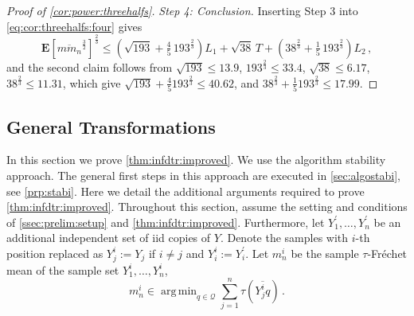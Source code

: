 \documentclass{article}
\newcommand*{\mc}[1]{\mathcal{#1}}
\newcommand{\lab}{\left[} %
\newcommand{\rab}{\right]} %
\newcommand{\ab}[1]{\lab #1 \rab} %
\newcommand{\abOf}[1]{\!\ab{#1}} %
\newcommand{\lb}{\left(} %
\newcommand{\rb}{\right)} %
\newcommand{\br}[1]{\lb #1 \rb} %
\newcommand{\E}{\mathbf{E}} %
\newcommand{\EOf}[1]{\E\abOf{#1}}
\newcommand{\pr}{^\prime}
\newcommand{\eqcm}{\,,} %
\newcommand{\eqfs}{\,.}
\DeclareMathOperator*{\argmin}{arg\,min}
\newcommand{\ol}[2]{\overline{#1#2}}
\newcommand{\tran}{\tau}
\begin{document}
\begin{proof}[Proof of \cref{cor:power:threehalfs}]
    \emph{Step 4: Conclusion.}
    Inserting Step 3 into \eqref{eq:cor:threehalfs:four} gives
    \begin{equation}
        \EOf{\ol{m}{m_n}^{\frac32}}^{\frac23}
        \leq
        \br{\sqrt{193} + \tfrac45\, 193^{\frac23}} L_1
        +
        \sqrt{38}\, T
        +
        \br{38^{\frac23} + \tfrac15\, 193^{\frac23}} L_2
        \eqcm
    \end{equation}
    and the second claim follows from
    $\sqrt{193} \leq 13.9$, $193^{\frac23}\leq 33.4$, $\sqrt{38}\leq 6.17$, $38^{\frac23}\leq 11.31$, which give
    $\sqrt{193} + \frac45 193^{\frac23} \leq 40.62$, and
    $38^{\frac23} + \frac15 193^{\frac23} \leq 17.99$.
\end{proof}
%
%
%
\subsection{General Transformations}
%
In this section we prove \cref{thm:infdtr:improved}. We use the algorithm stability approach. The general first steps in this approach are executed in \cref{sec:algostabi}, see \cref{prp:stabi}. Here we detail the additional arguments required to prove \cref{thm:infdtr:improved}.
Throughout this section, assume the setting and conditions of \cref{ssec:prelim:setup} and \cref{thm:infdtr:improved}. Furthermore, let $Y_1\pr, \dots, Y_n\pr$ be an additional independent set of iid copies of $Y$.
Denote the samples with $i$-th position replaced as $Y_j^i := Y_j$ if $i \neq j$ and $Y_i^i := Y_i\pr$.
Let $m_n^i$ be the sample $\tran$-Fr\'echet mean of the sample set $Y_1^i, \dots, Y_n^i$, 
\begin{equation}
    m_n^i \in \argmin_{q\in\mc Q} \sum_{j=1}^n \tran(\ol {Y_j^i}q)
    \eqfs
\end{equation}
\end{document}
